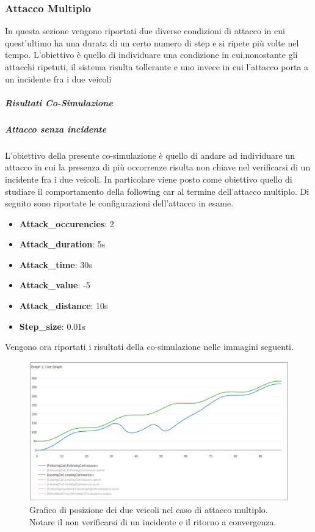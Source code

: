 \subsubsection{Attacco Multiplo}
In questa sezione vengono riportati due diverse condizioni di attacco in cui quest'ultimo ha una durata di un certo numero di step e si ripete più volte nel tempo. L'obiettivo è quello di individuare una condizione in cui,nonostante gli attacchi ripetuti, il sistema risulta tollerante e uno invece in cui l'attacco porta a un incidente fra i due veicoli
\subparagraph{Risultati Co-Simulazione}
\subparagraph{Attacco senza incidente}
L'obiettivo della presente co-simulazione è quello di andare ad individuare un attacco in cui la presenza di più occorrenze risulta non chiave nel verificarsi di un incidente fra i due veicoli. In particolare viene posto come obiettivo quello di studiare il comportamento della following car al termine dell'attacco multiplo. Di seguito sono riportate le configurazioni dell'attacco in esame.
\begin{itemize}
	\item \textbf{Attack\_occurencies}: 2
	\item \textbf{Attack\_duration}: 5s
	\item \textbf{Attack\_time}: 30s
	\item \textbf{Attack\_value}: -5
	\item \textbf{Attack\_distance}: 10s
	\item \textbf{Step\_size}: 0.01s
\end{itemize}
Vengono ora riportati i risultati della co-simulazione nelle immagini seguenti.
\begin{figure}[H]
	\centering
	\includegraphics[width=\textwidth]{img/MultiAttackAccelPlotXNoCrash.png}
	\caption{Grafico di posizione dei due veicoli nel caso di attacco multiplo. Notare il non verificarsi di un incidente e il ritorno a convergenza.}
\end{figure}

